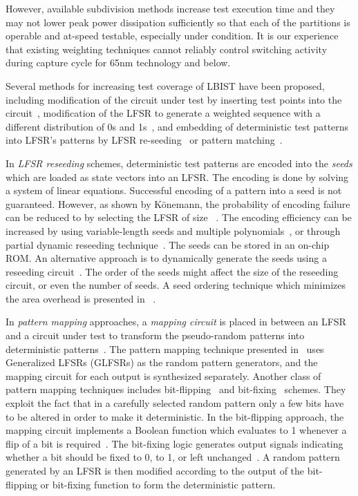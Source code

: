 \documentclass[conference]{IEEEtran}
\begin{document}
However, available subdivision methods increase test execution time and they may not lower peak power dissipation sufficiently so that each of the  partitions is operable and at-speed testable, especially under  condition.
It is our experience that existing weighting techniques cannot reliably control switching activity during capture cycle for 65nm technology and below.

Several methods for increasing test coverage of LBIST have been proposed, including modification of the circuit under test by inserting test points into the circuit~\cite{EiL83,ToM96,TaR96}, modification of the LFSR to generate a weighted sequence with a different distribution of 0s and 1s~\cite{ChM84}, and
embedding of deterministic test patterns into LFSR's patterns by 
LFSR re-seeding~\cite{Ko91} or pattern matching~\cite{GuP88}.

In {\em LFSR reseeding} schemes, deterministic test patterns are encoded into the \emph{seeds} which are loaded as state vectors into an LFSR.
The encoding is done by solving a system of linear equations.
Successful encoding of a pattern into a seed is not guaranteed.
However, as shown by K{\"o}nemann, the probability of encoding failure can be reduced to  
by selecting the LFSR of size ~\cite{Ko91}.
The encoding efficiency can be increased by using variable-length seeds and multiple polynomials~\cite{HeTRC92,RaTZ98}, or through partial dynamic reseeding technique~\cite{KrJT01}.
The seeds can be stored in an on-chip ROM. 
An alternative approach is to dynamically generate the seeds using a reseeding circuit~\cite{AlM03}.
The order of the seeds might affect the size of the reseeding circuit, or even the number of seeds.
A seed ordering technique which minimizes the area overhead is presented in~\cite{AlMM03} .

In {\em pattern mapping} approaches, a {\em mapping circuit} is placed in between an LFSR and a circuit under test to transform the pseudo-random patterns into deterministic patterns~\cite{Wu98}.
The pattern mapping technique presented in~\cite{ChP95} uses Generalized LFSRs (GLFSRs) as the random pattern generators, and the mapping circuit for each output is synthesized separately.
Another class of pattern mapping techniques includes bit-flipping~\cite{WuK96} and bit-fixing~\cite{ToM96_bitfix} schemes.
They exploit the fact that in a carefully selected random pattern  
only a few bits have to be altered in order to make it deterministic.
In the bit-flipping approach, the mapping circuit implements a Boolean function which evaluates to 1 whenever a flip of a bit is required~\cite{WuK96}.
The bit-fixing logic generates output signals indicating whether a bit should be fixed to 0, to 1, or left unchanged~\cite{ToM96_bitfix}.
A random pattern generated by an LFSR is then modified according to the output of the bit-flipping or bit-fixing function to form the deterministic pattern.
\end{document}
